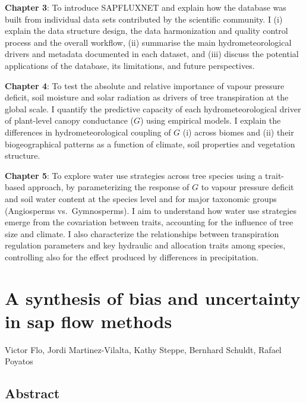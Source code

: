 \documentclass[11pt,twoside]{reedthesis}
\begin{document}
\textbf{Chapter 3}: To introduce SAPFLUXNET and explain how the database
was built from individual data sets contributed by the scientific
community. I (i) explain the data structure design, the data
harmonization and quality control process and the overall workflow, (ii)
summarise the main hydrometeorological drivers and metadata documented
in each dataset, and (iii) discuss the potential applications of the
database, its limitations, and future perspectives.\par

\textbf{Chapter 4}: To test the absolute and relative importance of
vapour pressure deficit, soil moisture and solar radiation as drivers of
tree transpiration at the global scale. I quantify the predictive
capacity of each hydrometeorological driver of plant-level canopy
conductance (\(G\)) using empirical models. I explain the differences in
hydrometeorological coupling of \(G\) (i) across biomes and (ii) their
biogeographical patterns as a function of climate, soil properties and
vegetation structure.\par

\textbf{Chapter 5}: To explore water use strategies across tree species
using a trait-based approach, by parameterizing the response of \(G\) to
vapour pressure deficit and soil water content at the species level and
for major taxonomic groups (Angiosperms vs.~Gymnosperms). I aim to
understand how water use strategies emerge from the covariation between
traits, accounting for the influence of tree size and climate. I also
characterize the relationships between transpiration regulation
parameters and key hydraulic and allocation traits among species,
controlling also for the effect produced by differences in
precipitation.\par

\chapter[Bias and uncertainty in sap flow methods]{A synthesis of bias and uncertainty in sap flow methods}

\setlength{\parindent}{0pt} Victor Flo, Jordi Martinez-Vilalta, Kathy
Steppe, Bernhard Schuldt, Rafael Poyatos \newpage
\setlength{\parindent}{30pt}

\section*{Abstract}
\end{document}
